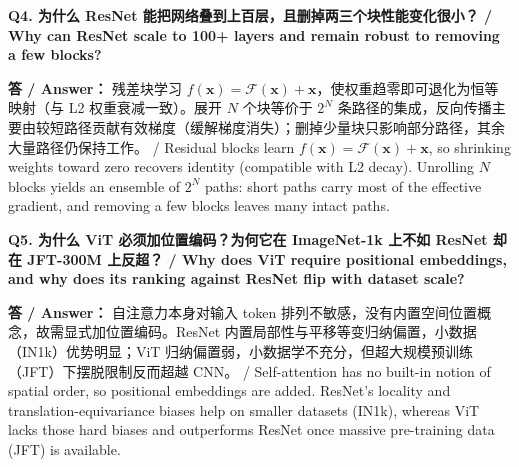 \textbf{Q4. 为什么 ResNet 能把网络叠到上百层，且删掉两三个块性能变化很小？ / Why can ResNet scale to 100+ layers and remain robust to removing a few blocks?}

\textbf{答 / Answer：} 残差块学习 $f(\mathbf{x})=\mathcal{F}(\mathbf{x})+\mathbf{x}$，使权重趋零即可退化为恒等映射（与 L2 权重衰减一致）。展开 $N$ 个块等价于 $2^N$ 条路径的集成，反向传播主要由较短路径贡献有效梯度（缓解梯度消失）；删掉少量块只影响部分路径，其余大量路径仍保持工作。 / Residual blocks learn $f(\mathbf{x})=\mathcal{F}(\mathbf{x})+\mathbf{x}$, so shrinking weights toward zero recovers identity (compatible with L2 decay). Unrolling $N$ blocks yields an ensemble of $2^N$ paths: short paths carry most of the effective gradient, and removing a few blocks leaves many intact paths.

\textbf{Q5. 为什么 ViT 必须加位置编码？为何它在 ImageNet-1k 上不如 ResNet 却在 JFT-300M 上反超？ / Why does ViT require positional embeddings, and why does its ranking against ResNet flip with dataset scale?}

\textbf{答 / Answer：} 自注意力本身对输入 token 排列不敏感，没有内置空间位置概念，故需显式加位置编码。ResNet 内置局部性与平移等变归纳偏置，小数据（IN1k）优势明显；ViT 归纳偏置弱，小数据学不充分，但超大规模预训练（JFT）下摆脱限制反而超越 CNN。 / Self-attention has no built-in notion of spatial order, so positional embeddings are added. ResNet's locality and translation-equivariance biases help on smaller datasets (IN1k), whereas ViT lacks those hard biases and outperforms ResNet once massive pre-training data (JFT) is available.



